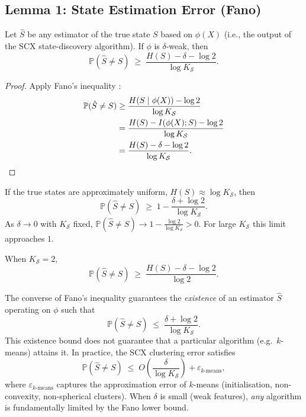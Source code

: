 \subsection{Lemma 1: State Estimation Error (Fano)}
\label{sec:thm2:lemma1}

\begin{lemma}
\label{lem:fano}
Let $\hat{S}$ be any estimator of the true state $S$ based on $\phi(X)$
(i.e., the output of the SCX state-discovery algorithm). If $\phi$ is
$\delta$-weak, then
\begin{equation}
\mathbb{P}(\hat{S} \neq S) \;\geq\;
\frac{H(S) - \delta - \log 2}{\log K_{\mathcal{S}}}.
\label{eq:fano-bound}
\end{equation}
\end{lemma}

\begin{proof}
Apply Fano's inequality \cite{fano1961,cover2006}:
\begin{align*}
\mathbb{P}(\hat{S} \neq S)
&\geq \frac{H(S \mid \phi(X)) - \log 2}{\log K_{\mathcal{S}}} \\
&= \frac{H(S) - I(\phi(X); S) - \log 2}{\log K_{\mathcal{S}}} \\
&= \frac{H(S) - \delta - \log 2}{\log K_{\mathcal{S}}}.
\qedhere
\end{align*}
\end{proof}

\begin{corollary}
\label{cor:fano-uniform}
If the true states are approximately uniform,
$H(S) \approx \log K_{\mathcal{S}}$, then
\[
\mathbb{P}(\hat{S} \neq S) \;\geq\; 1 - \frac{\delta + \log 2}{\log K_{\mathcal{S}}}.
\]
As $\delta \to 0$ with $K_{\mathcal{S}}$ fixed,
$\mathbb{P}(\hat{S} \neq S) \to 1 - \frac{\log 2}{\log K_{\mathcal{S}}} > 0$.
For large $K_{\mathcal{S}}$ this limit approaches $1$.
\end{corollary}

\begin{corollary}
\label{cor:fano-two-state}
When $K_{\mathcal{S}} = 2$,
\[
\mathbb{P}(\hat{S} \neq S) \;\geq\;
\frac{H(S) - \delta - \log 2}{\log 2}.
\]
\end{corollary}

\begin{remark}[Achievability]
\label{remark:fano-achievability}
The converse of Fano's inequality guarantees the \emph{existence} of an
estimator $\hat{S}$ operating on $\phi$ such that
\[
\mathbb{P}(\hat{S} \neq S) \;\leq\; \frac{\delta + \log 2}{\log K_{\mathcal{S}}}.
\]
This existence bound does not guarantee that a particular algorithm
(e.g.\ $k$-means) attains it. In practice, the SCX clustering error satisfies
\[
\mathbb{P}(\hat{S} \neq S) \;\leq\; O\!\left(\frac{\delta}{\log K_{\mathcal{S}}}\right)
+ \varepsilon_{k\text{-means}},
\]
where $\varepsilon_{k\text{-means}}$ captures the approximation error of
$k$-means (initialisation, non-convexity, non-spherical clusters). When
$\delta$ is small (weak features), \emph{any} algorithm is fundamentally
limited by the Fano lower bound.
\end{remark}

